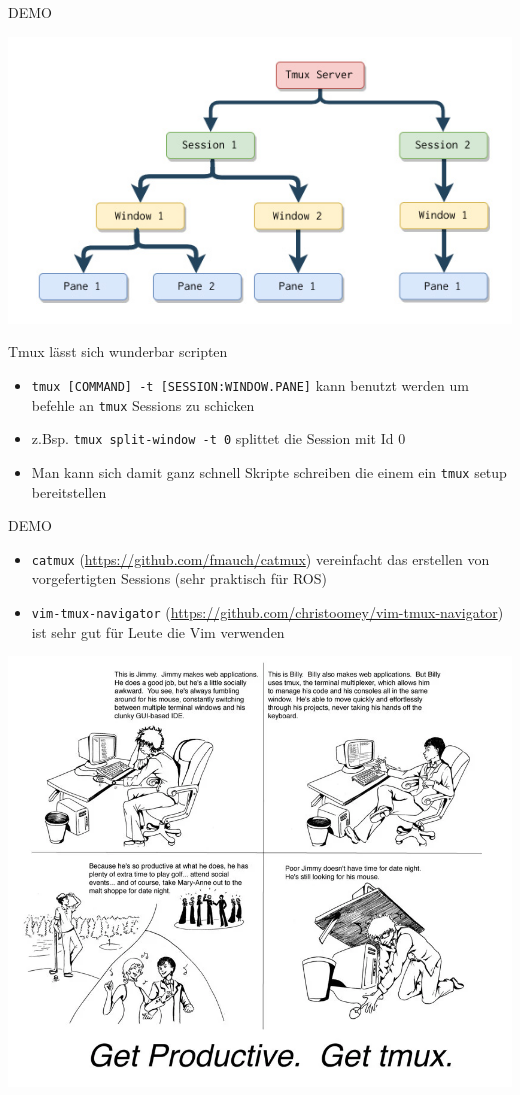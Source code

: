 \documentclass[plain]{beamer}
\newcommand{\tmux}{\texttt{tmux}}
\newcommand{\demoslide}{\begin{frame}
  \center \huge DEMO
\end{frame}}
\begin{document}
\demoslide

\begin{frame}
  \center\includegraphics[width=\textwidth]{imgs/tmux-working-diagram.jpg}
\end{frame}

\begin{frame}
  Tmux lässt sich wunderbar scripten
  \begin{itemize}
    \item \texttt{tmux [COMMAND] -t [SESSION:WINDOW.PANE]} kann benutzt werden um befehle an \tmux{}
      Sessions zu schicken
    \item z.Bsp. \texttt{tmux split-window -t 0} splittet die Session mit Id 0
    \item Man kann sich damit ganz schnell Skripte schreiben die einem ein \tmux{} setup bereitstellen
  \end{itemize}
\end{frame}

\demoslide{}

\begin{frame}
\begin{itemize}
  \item \texttt{catmux} (\url{https://github.com/fmauch/catmux}) vereinfacht das erstellen von
    vorgefertigten Sessions (sehr praktisch für ROS)
  \item \texttt{vim-tmux-navigator} (\url{https://github.com/christoomey/vim-tmux-navigator}) ist
    sehr gut für Leute die Vim verwenden
\end{itemize}
\end{frame}

\begin{frame}
  \includegraphics[width=\textwidth]{imgs/tmux_final_meme.png}
\end{frame}
\end{document}
